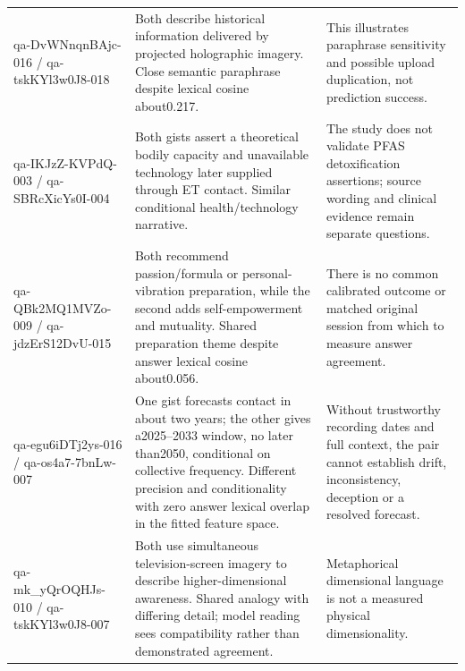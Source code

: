 \begin{longtable}{p{}p{}p{}}
qa-DvWNnqnBAjc-016 / qa-tskKYl3w0J8-018 & Both describe historical information delivered by projected holographic imagery. Close semantic paraphrase despite lexical cosine about0.217. & This illustrates paraphrase sensitivity and possible upload duplication, not prediction success. \\
qa-IKJzZ-KVPdQ-003 / qa-SBRcXicYs0I-004 & Both gists assert a theoretical bodily capacity and unavailable technology later supplied through ET contact. Similar conditional health/technology narrative. & The study does not validate PFAS detoxification assertions; source wording and clinical evidence remain separate questions. \\
qa-QBk2MQ1MVZo-009 / qa-jdzErS12DvU-015 & Both recommend passion/formula or personal-vibration preparation, while the second adds self-empowerment and mutuality. Shared preparation theme despite answer lexical cosine about0.056. & There is no common calibrated outcome or matched original session from which to measure answer agreement. \\
qa-egu6iDTj2ys-016 / qa-os4a7-7bnLw-007 & One gist forecasts contact in about two years; the other gives a2025--2033 window, no later than2050, conditional on collective frequency. Different precision and conditionality with zero answer lexical overlap in the fitted feature space. & Without trustworthy recording dates and full context, the pair cannot establish drift, inconsistency, deception or a resolved forecast. \\
qa-mk\_yQrOQHJs-010 / qa-tskKYl3w0J8-007 & Both use simultaneous television-screen imagery to describe higher-dimensional awareness. Shared analogy with differing detail; model reading sees compatibility rather than demonstrated agreement. & Metaphorical dimensional language is not a measured physical dimensionality. \\
\bottomrule
\end{longtable}
\endgroup
